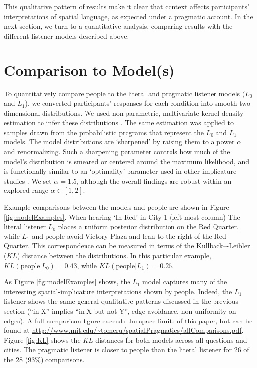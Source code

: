 \documentclass[10pt,letterpaper]{article}
\begin{document}
This qualitative pattern of results make it clear that context affects participants' interpretations of spatial language, as expected under a pragmatic account. In the next section, we turn to a quantitative analysis, comparing results with the different listener models described above. 

\section{Comparison to Model(s)}

To quantitatively compare people to the literal and pragmatic listener models ($L_0$ and $L_1$), we converted participants' responses for each condition into smooth two-dimensional distributions. We used non-parametric, multivariate kernel density estimation to infer these distributions \cite{epanechnikov1969non}. The same estimation was applied to samples drawn from the probabilistic programs that represent the $L_0$ and $L_1$ models. The model distributions are `sharpened' by raising them to a power $\alpha$ and renormalizing. Such a sharpening parameter controls how much of the model's distribution is smeared or centered around the maximum likelihood, and is functionally similar to an `optimality' parameter used in other implicature studies \cite{ndg+ast:topics2013,kao2014}. We set $\alpha=1.5$, although the overall findings are robust within an explored range $\alpha \in [1,2]$. 

Example comparisons between the models and people are shown in Figure \ref{fig:modelExamples}. When hearing `In Red' in City 1 (left-most column) The literal listener $L_0$ places a uniform posterior distribution on the Red Quarter, while $L_1$ and people avoid Victory Plaza and lean to the right of the Red Quarter. This correspondence can be measured in terms of the Kullback–-Leibler ($KL$) distance between the distributions. In this particular example, $KL(\text{people} | L_0) = 0.43$, while $KL(\text{people} | L_1) = 0.25$. 

As Figure \ref{fig:modelExamples} shows, the $L_1$ model captures many of the interesting spatial-implicature interpretations shown by people.
Indeed, the $L_1$ listener shows the same general qualitative patterns discussed in the previous section (``in X'' implies ``in X but not Y'', edge avoidance, non-uniformity on edges). A full comparison figure exceeds the space limits of this paper, but can be found at \url{http://www.mit.edu/~tomeru/spatialPragmatics/allComparisons.pdf}. Figure \ref{fig:KL} shows the $KL$ distances for both models across all questions and cities. The pragmatic listener is closer to people than the literal listener for 26 of the 28 (93\%) comparisons. 
\end{document}
